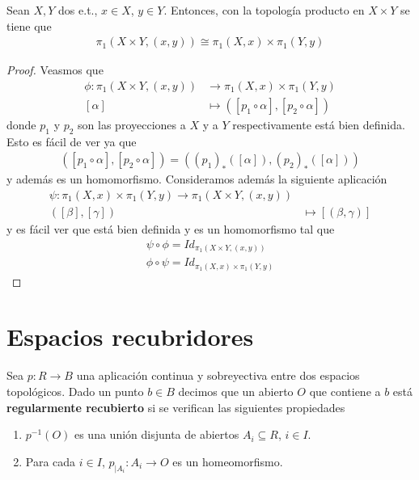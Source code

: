 \begin{teo}
    Sean $X,Y$ dos e.t., $x\in X$, $y\in Y$. Entonces, con la topología producto en $X\times Y$ se tiene que 
    \begin{gather*}
        \pi_1(X\times Y, (x,y)) \cong \pi_1(X,x) \times \pi_1(Y,y)
    \end{gather*}
    \begin{proof}
        Veasmos que 
        \begin{align*}
            \phi: \pi_1(X\times Y,(x,y)) &\longrightarrow \pi_1(X,x) \times \pi_1(Y,y) \\
            [\alpha] & \longmapsto ([p_1 \circ \alpha], [p_2\circ \alpha])
        \end{align*}
        donde $p_1$ y $p_2$ son las proyecciones a $X$ y a $Y$ respectivamente está bien definida. Esto es fácil de ver ya que 
        \begin{gather*}
            ([p_1 \circ \alpha], [p_2\circ \alpha]) = ((p_1)_*([\alpha]), (p_2)_*([\alpha]))
        \end{gather*}
        y además es un homomorfismo. Consideramos además la siguiente aplicación
        \begin{align*}
            \psi: \pi_1(X,x)\times \pi_1(Y,y) \longrightarrow \pi_1(X\times Y, (x,y))\\
            ([\beta], [\gamma]) & \longmapsto [(\beta, \gamma)]
        \end{align*}
        y es fácil ver que está bien definida y es un homomorfismo tal que
        \begin{gather*}
            \psi \circ \phi = Id_{\pi_1(X\times Y,(x,y))}\\
            \phi \circ \psi = Id_{\pi_1(X,x) \times \pi_1(Y,y)}
        \end{gather*}
    \end{proof}
\end{teo}

\section{Espacios recubridores}

\begin{definicion}
    Sea $p:R\to B$ una aplicación continua y sobreyectiva entre dos espacios topológicos. Dado un punto $b\in B$ decimos que un abierto $O$ que contiene a $b$ está \textbf{regularmente recubierto} si se verifican las siguientes propiedades
    \begin{enumerate}
        \item $p^{-1}(O)$ es una unión disjunta de abiertos $A_i\subseteq R$, $i\in I$.
        \item Para cada $i\in I$, $p_{|A_i}:A_i \to O$ es un homeomorfismo.
    \end{enumerate}
\end{definicion}


